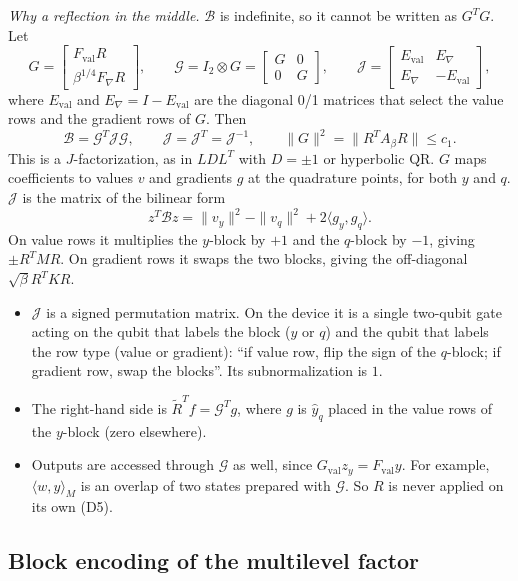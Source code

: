 \documentclass[11pt,a4paper]{article}
\newcommand{\B}{\mathcal{B}}
\newcommand{\G}{\mathcal{G}}
\newcommand{\J}{\mathcal{J}}
\newcommand{\Rt}{\widetilde R}
\theoremstyle{remark}
\begin{document}
\emph{Why a reflection in the middle.} $\B$ is indefinite, so it cannot be
written as $G^TG$. Let
\[
G=\begin{bmatrix}F_{\mathrm{val}}R\\ \beta^{1/4}F_\nabla R\end{bmatrix},\qquad
\G=I_2\otimes G=\begin{bmatrix}G&0\\0&G\end{bmatrix},\qquad
\J=\begin{bmatrix}E_{\mathrm{val}} & E_\nabla\\ E_\nabla & -E_{\mathrm{val}}\end{bmatrix},
\]
where $E_{\mathrm{val}}$ and $E_\nabla=I-E_{\mathrm{val}}$ are the diagonal 0/1 matrices that
select the value rows and the gradient rows of $G$. Then
\begin{equation}\label{eq:BGJG}
\B=\G^T\J\G,\qquad \J=\J^T=\J^{-1},\qquad \|G\|^2=\|R^TA_\beta R\|\le c_1 .
\end{equation}
This is a $J$-factorization, as in $LDL^T$ with $D=\pm1$ or hyperbolic QR.
$G$ maps coefficients to values $v$ and gradients $g$ at the quadrature
points, for both $y$ and $q$. $\J$ is the matrix of the bilinear form
\[
z^T\B z=\|v_y\|^2-\|v_q\|^2+2\langle g_y,g_q\rangle .
\]
On value rows it multiplies the $y$-block by $+1$ and the $q$-block by
$-1$, giving $\pm R^TMR$. On gradient rows it swaps the two blocks, giving
the off-diagonal $\sqrt\beta R^TKR$.
\begin{itemize}
\item $\J$ is a signed permutation matrix. On the device it is a single
  two-qubit gate acting on the qubit that labels the block ($y$ or $q$)
  and the qubit that labels the row type (value or gradient): ``if value
  row, flip the sign of the $q$-block; if gradient row, swap the
  blocks''. Its subnormalization is $1$.
\item The right-hand side is $\Rt^Tf=\G^Tg$, where $g$ is $\hat y_q$ placed in
  the value rows of the $y$-block (zero elsewhere).
\item Outputs are accessed through $\G$ as well, since $G_{\mathrm{val}}z_y=F_{\mathrm{val}}y$.
  For example, $\langle w,y\rangle_M$ is an overlap of two states prepared
  with $\G$. So $R$ is never applied on its own (D5).
\end{itemize}

\subsection{Block encoding of the multilevel factor}\label{sec:blockG}
\end{document}
